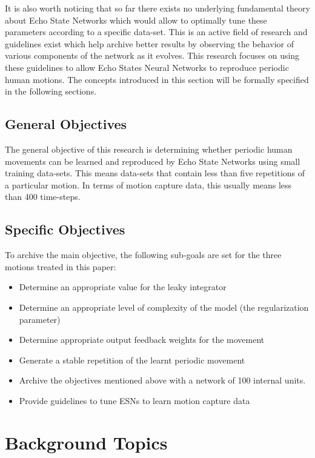 \documentclass[letterpaper,9pt]{article}
\begin{document}
It is also worth noticing that so far there exists no underlying fundamental theory about Echo State Networks which would allow to optimally tune these parameters according to a specific data-set. This is an active field of research and guidelines exist which help archive better results by observing the behavior of various components of the network as it evolves. This research focuses on using these guidelines to allow Echo States Neural Networks to reproduce periodic human motions. The concepts introduced in this section will be formally specified in the following sections.

\subsection{General Objectives}

The general objective of this research is determining whether periodic human movements can be learned and reproduced by Echo State Networks using small training data-sets. This means data-sets that contain less than five repetitions of a particular motion. In terms of motion capture data, this usually means less than 400 time-steps.

\subsection{Specific Objectives}

To archive the main objective, the following sub-goals are set for the three motions treated in this paper:

\begin{itemize}
  \item Determine an appropriate value for the leaky integrator
  \item Determine an appropriate level of complexity of the model (the regularization parameter)
  \item Determine appropriate output feedback weights for the movement
  \item Generate a stable repetition of the learnt periodic movement
  \item Archive the objectives mentioned above with a network of 100 internal units.
  \item Provide guidelines to tune ESNs to learn motion capture data
\end{itemize}

\section{Background Topics}
\end{document}
